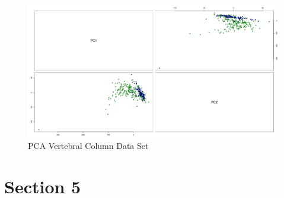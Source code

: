 \documentclass{report}
\begin{document}
\begin{figure}[h!]
  \includegraphics[width=\linewidth]{pca_vertebral_column_data_set.png}
  \caption{PCA Vertebral Column Data Set}
  \label{fig:PCAVertebralColumnDataSetScatterPlot}
\end{figure}

\chapter{Section 5}
\end{document}
